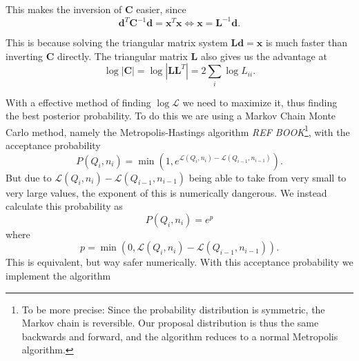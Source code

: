 \documentclass{emulateapj}
\begin{document}
This makes the inversion of $\mathbf{C}$ easier, since
\begin{equation}
\mathbf{d}^T\mathbf{C}^{-1}\mathbf{d} = \mathbf{x}^T\mathbf{x} \Leftrightarrow \mathbf{x} = \mathbf{L}^{-1}\mathbf{d}.
\end{equation}

This is because solving the triangular matrix system $\mathbf{L}\mathbf{d} = \mathbf{x}$ is much faster than inverting $\mathbf{C}$ directly. The triangular matrix $\mathbf{L}$ also gives us the advantage at
\begin{equation}
\log|\mathbf{C}| = \log |\mathbf{L}\mathbf{L}^T| = 2\sum_i \log L_{ii}.
\end{equation}


With a effective method of finding $\log \mathcal{L}$ we need to maximize it, thus finding the best posterior probability. To do this we are using a Markov Chain Monte Carlo method, namely the Metropolis-Hastings algorithm \emph{REF BOOK}\footnote{To be more precise: Since the probability distribution is symmetric, the Markov chain is reversible. Our proposal distribution is thus the same backwards and forward, and the algorithm reduces to a normal Metropolis algorithm.}, with the acceptance probability
\begin{equation}
P(Q_i,n_i) = \min\left(1,e^{\mathcal{L}(Q_{i},n_{i})-\mathcal{L}(Q_{i-1},n_{i-1})}\right).
\end{equation} 
But due to $\mathcal{L}(Q_{i},n_{i})-\mathcal{L}(Q_{i-1},n_{i-1})$ being able to take from very small to very large values, the exponent of this is numerically dangerous. We instead calculate this probability as
\begin{equation}
P(Q_i,n_i) = e^{p}
\label{eq:AccProb}
\end{equation}
where
\begin{equation}
p = \min\left(0,\mathcal{L}(Q_{i},n_{i})-\mathcal{L}(Q_{i-1},n_{i-1})\right).
\label{eq:accProbExp}
\end{equation}
This is equivalent, but way safer numerically. With this acceptance probability we implement the algorithm
\end{document}
